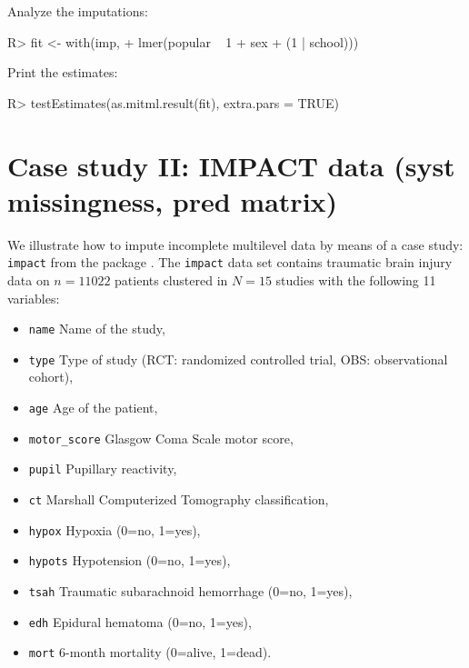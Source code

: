 \documentclass[
]{jss}
\providecommand{\tightlist}{%
  \setlength{\itemsep}{0pt}\setlength{\parskip}{0pt}}
\begin{document}
Analyze the imputations:

\begin{CodeChunk}
\begin{CodeInput}
R> fit <- with(imp, 
+             lmer(popular ~ 1 + sex + (1 | school))) 
\end{CodeInput}
\end{CodeChunk}

Print the estimates:

\begin{CodeChunk}
\begin{CodeInput}
R> testEstimates(as.mitml.result(fit), extra.pars = TRUE)
\end{CodeInput}
\end{CodeChunk}

\hypertarget{case-study-ii-impact-data-syst-missingness-pred-matrix}{%
\section{Case study II: IMPACT data (syst missingness, pred
matrix)}\label{case-study-ii-impact-data-syst-missingness-pred-matrix}}

We illustrate how to impute incomplete multilevel data by means of a
case study: \texttt{impact} from the  package
\citep[empirical data on traumatic brain injuries, \(n = 11,022\) units
across \(N = 15\) clusters,][]{metamisc}. The \texttt{impact} data set
contains traumatic brain injury data on \(n = 11022\) patients clustered
in \(N = 15\) studies with the following 11 variables:

\begin{itemize}
\tightlist
\item
  \texttt{name} Name of the study,
\item
  \texttt{type} Type of study (RCT: randomized controlled trial, OBS:
  observational cohort),
\item
  \texttt{age} Age of the patient,
\item
  \texttt{motor\_score} Glasgow Coma Scale motor score,
\item
  \texttt{pupil} Pupillary reactivity,
\item
  \texttt{ct} Marshall Computerized Tomography classification,
\item
  \texttt{hypox} Hypoxia (0=no, 1=yes),
\item
  \texttt{hypots} Hypotension (0=no, 1=yes),
\item
  \texttt{tsah} Traumatic subarachnoid hemorrhage (0=no, 1=yes),
\item
  \texttt{edh} Epidural hematoma (0=no, 1=yes),
\item
  \texttt{mort} 6-month mortality (0=alive, 1=dead).
\end{itemize}
\end{document}
